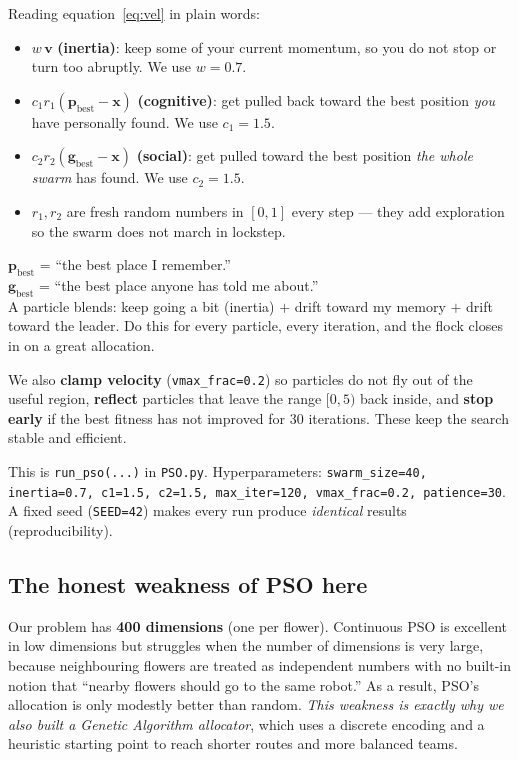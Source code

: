 \documentclass[11pt]{article}
\begin{document}
Reading equation~\eqref{eq:vel} in plain words:
\begin{itemize}[nosep]
  \item $w\,\mathbf{v}$ \textbf{(inertia)}: keep some of your current momentum,
        so you do not stop or turn too abruptly. We use $w=0.7$.
  \item $c_1 r_1(\mathbf{p}_{\text{best}}-\mathbf{x})$ \textbf{(cognitive)}: get
        pulled back toward the best position \emph{you} have personally found.
        We use $c_1=1.5$.
  \item $c_2 r_2(\mathbf{g}_{\text{best}}-\mathbf{x})$ \textbf{(social)}: get
        pulled toward the best position \emph{the whole swarm} has found. We use
        $c_2=1.5$.
  \item $r_1,r_2$ are fresh random numbers in $[0,1]$ every step --- they add
        exploration so the swarm does not march in lockstep.
\end{itemize}

\begin{intuition}
$\mathbf{p}_{\text{best}}$ = ``the best place I remember.''\\
$\mathbf{g}_{\text{best}}$ = ``the best place anyone has told me about.''\\
A particle blends: keep going a bit (inertia) $+$ drift toward my memory $+$
drift toward the leader. Do this for every particle, every iteration, and the
flock closes in on a great allocation.
\end{intuition}

\begin{whybox}
We also \textbf{clamp velocity} (\texttt{vmax\_frac=0.2}) so particles do not fly
out of the useful region, \textbf{reflect} particles that leave the range
$[0,5)$ back inside, and \textbf{stop early} if the best fitness has not improved
for 30 iterations. These keep the search stable and efficient.
\end{whybox}

\begin{codebox}
This is \texttt{run\_pso(...)} in \texttt{PSO.py}. Hyperparameters:
\texttt{swarm\_size=40, inertia=0.7, c1=1.5, c2=1.5, max\_iter=120,
vmax\_frac=0.2, patience=30}. A fixed seed (\texttt{SEED=42}) makes every run
produce \emph{identical} results (reproducibility).
\end{codebox}

\subsection{The honest weakness of PSO here}
Our problem has \textbf{400 dimensions} (one per flower). Continuous PSO is
excellent in low dimensions but struggles when the number of dimensions is very
large, because neighbouring flowers are treated as independent numbers with no
built-in notion that ``nearby flowers should go to the same robot.'' As a
result, PSO's allocation is only modestly better than random. \emph{This weakness
is exactly why we also built a Genetic Algorithm allocator}, which uses a
discrete encoding and a heuristic starting point to reach shorter routes and
more balanced teams.
\end{document}
